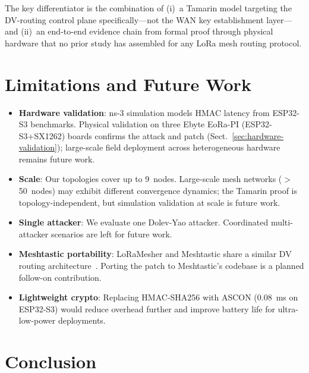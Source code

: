 \documentclass[10pt,journal,compsoc]{IEEEtran}
\begin{document}
The key differentiator is the combination of (i)~a Tamarin model
targeting the DV-routing control plane specifically—not the WAN
key establishment layer—and (ii)~an end-to-end evidence chain from
formal proof through physical hardware that no prior study has
assembled for any LoRa mesh routing protocol.

\section{Limitations and Future Work}
\label{sec:limitations}

\begin{itemize}
  \item \textbf{Hardware validation}: ns-3 simulation models HMAC
    latency from ESP32-S3 benchmarks. Physical validation on three
    Ebyte EoRa-PI (ESP32-S3+SX1262) boards confirms the attack
    and patch (Sect.~\ref{sec:hardware-validation}); large-scale
    field deployment across heterogeneous hardware remains future work.

  \item \textbf{Scale}: Our topologies cover up to 9~nodes.
    Large-scale mesh networks ($>$50~nodes) may exhibit different
    convergence dynamics; the Tamarin proof is topology-independent,
    but simulation validation at scale is future work.

  \item \textbf{Single attacker}: We evaluate one Dolev-Yao
    attacker. Coordinated multi-attacker scenarios are left for
    future work.

  \item \textbf{Meshtastic portability}: LoRaMesher and Meshtastic
    share a similar DV routing architecture~\cite{cve2025-meshtastic-entropy}.
    Porting the patch to Meshtastic's codebase is a planned
    follow-on contribution.

  \item \textbf{Lightweight crypto}: Replacing HMAC-SHA256 with
    ASCON (0.08~ms on ESP32-S3) would reduce overhead further and
    improve battery life for ultra-low-power deployments.
\end{itemize}

\section{Conclusion}
\label{sec:conclusion}
\end{document}
